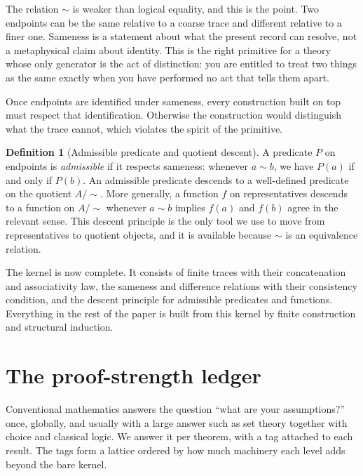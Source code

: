 \documentclass[11pt,a4paper]{article}
\theoremstyle{definition}
\newtheorem{definition}[theorem]{Definition}
\theoremstyle{remark}
\begin{document}
The relation $\sim$ is weaker than logical equality, and this is the point. Two
endpoints can be the same relative to a coarse trace and different relative to a
finer one. Sameness is a statement about what the present record can resolve,
not a metaphysical claim about identity. This is the right primitive for a
theory whose only generator is the act of distinction: you are entitled to treat
two things as the same exactly when you have performed no act that tells them
apart.

Once endpoints are identified under sameness, every construction built on top
must respect that identification. Otherwise the construction would distinguish
what the trace cannot, which violates the spirit of the primitive.

\begin{definition}[Admissible predicate and quotient descent]\label{def:subst}
A predicate $P$ on endpoints is \emph{admissible} if it respects sameness:
whenever $a \sim b$, we have $P(a)$ if and only if $P(b)$. An admissible
predicate descends to a well-defined predicate on the quotient
$A / {\sim}$. More generally, a function $f$ on representatives descends to a
function on $A / {\sim}$ whenever $a \sim b$ implies $f(a)$ and $f(b)$ agree in
the relevant sense. This descent principle is the only tool we use to move from
representatives to quotient objects, and it is available because $\sim$ is an
equivalence relation.
\end{definition}

The kernel is now complete. It consists of finite traces with their
concatenation and associativity law, the sameness and difference relations with
their consistency condition, and the descent principle for admissible predicates
and functions. Everything in the rest of the paper is built from this kernel by
finite construction and structural induction.

\section{The proof-strength ledger}\label{sec:strength}

Conventional mathematics answers the question ``what are your assumptions?''
once, globally, and usually with a large answer such as set theory together with
choice and classical logic. We answer it per theorem, with a tag attached to
each result. The tags form a lattice ordered by how much machinery each level
adds beyond the bare kernel.
\end{document}
